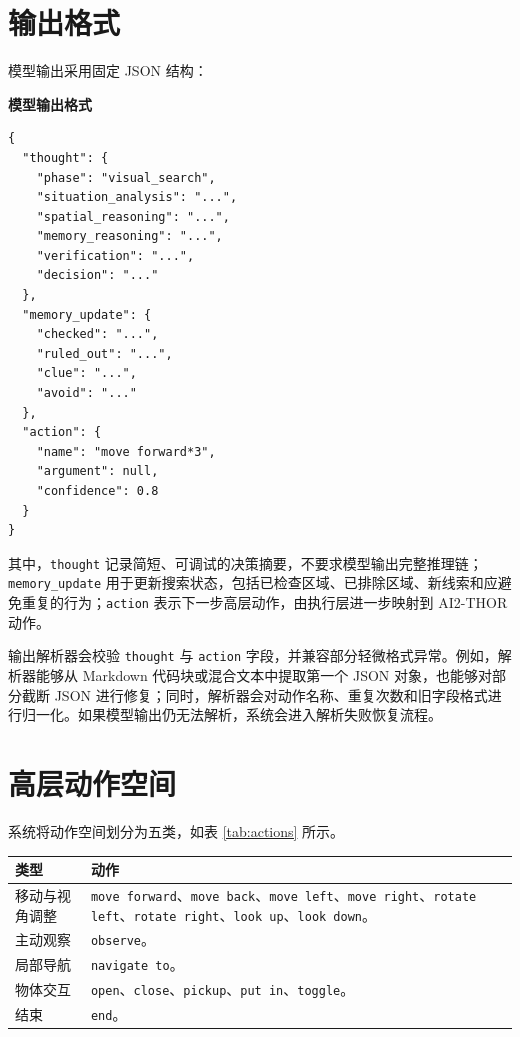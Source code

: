 \documentclass[UTF8,a4paper,12pt]{ctexart}
\begin{document}
\section{输出格式}

模型输出采用固定 JSON 结构：

\noindent\textbf{模型输出格式}
\begin{lstlisting}
{
  "thought": {
    "phase": "visual_search",
    "situation_analysis": "...",
    "spatial_reasoning": "...",
    "memory_reasoning": "...",
    "verification": "...",
    "decision": "..."
  },
  "memory_update": {
    "checked": "...",
    "ruled_out": "...",
    "clue": "...",
    "avoid": "..."
  },
  "action": {
    "name": "move forward*3",
    "argument": null,
    "confidence": 0.8
  }
}
\end{lstlisting}

其中，\texttt{thought} 记录简短、可调试的决策摘要，不要求模型输出完整推理链；\texttt{memory\_update} 用于更新搜索状态，包括已检查区域、已排除区域、新线索和应避免重复的行为；\texttt{action} 表示下一步高层动作，由执行层进一步映射到 AI2-THOR 动作。

输出解析器会校验 \texttt{thought} 与 \texttt{action} 字段，并兼容部分轻微格式异常。例如，解析器能够从 Markdown 代码块或混合文本中提取第一个 JSON 对象，也能够对部分截断 JSON 进行修复；同时，解析器会对动作名称、重复次数和旧字段格式进行归一化。如果模型输出仍无法解析，系统会进入解析失败恢复流程。

\section{高层动作空间}

系统将动作空间划分为五类，如表 \ref{tab:actions} 所示。

\begin{center}
\begin{minipage}{0.95\textwidth}
\label{tab:actions}
\begin{tabularx}{\textwidth}{p{3.2cm}X}
\toprule
类型 & 动作 \\
\midrule
移动与视角调整 & \texttt{move forward}、\texttt{move back}、\texttt{move left}、\texttt{move right}、\texttt{rotate left}、\texttt{rotate right}、\texttt{look up}、\texttt{look down}。 \\
主动观察 & \texttt{observe}。 \\
局部导航 & \texttt{navigate to}。 \\
物体交互 & \texttt{open}、\texttt{close}、\texttt{pickup}、\texttt{put in}、\texttt{toggle}。 \\
结束 & \texttt{end}。 \\
\bottomrule
\end{tabularx}
\end{minipage}
\end{center}
\end{document}
